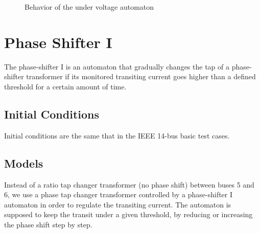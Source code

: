 \documentclass[a4paper, 12pt]{report}
\begin{document}
\begin{figure}[H]
\caption{Behavior of the under voltage automaton}
\end{figure}


\newpage
\section{Phase Shifter I}
\label{PhaseShifterIAutomaton}

The phase-shifter I is an automaton that gradually changes the tap of a phase-shifter transformer if its monitored transiting current goes higher than a defined threshold for a certain amount of time.

\subsection{Initial Conditions}

Initial conditions are the same that in the IEEE 14-bus basic test cases.

\subsection{Models}

Instead of a ratio tap changer transformer (no phase shift) between buses 5 and 6, we use a phase tap changer transformer controlled by a phase-shifter I automaton in order to regulate the transiting current.
The automaton is supposed to keep the transit under a given threshold, by reducing or increasing the phase shift step by step. \\
\end{document}
